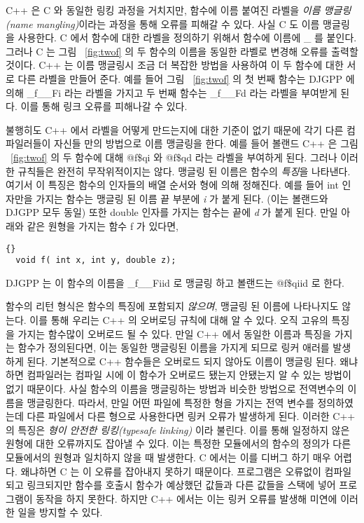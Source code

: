 C++ 은 C 와 동일한 링킹 과정을 거치지만, 함수에 이름 붙여진 라벨을 \emph{이름 맹글링(name mangling)}이라는
과정을 통해 오류를 피해갈 수 있다. 사실 C 도 이름 맹글링을 사용한다. C 에서 함수에 대한 라벨을 정의하기 위해서
함수에 이름에 \_ 를 붙인다. 그러나 C 는 그림 ~\ref{fig:twof} 의 두 함수의 이름을 동일한 라벨로 변경해
오류를 출력할 것이다. C++ 는 이름 맹글링시 조금 더 복잡한 방법을 사용하여 이 두 함수에 대한 서로 다른 라벨을
만들어 준다. 예를 들어 그림 ~\ref{fig:twof} 의 첫 번째 함수는 DJGPP  에 의해 {\code \_f\_\_Fi} 라는 라벨을 가지고
두 번째 함수는 {\code \_f\_\_Fd} 라는 라벨을 부여받게 된다. 이를 통해 링크 오류를 피해나갈 수 있다. 


불행히도 C++ 에서 라벨을 어떻게 만드는지에 대한 기준이 없기 때문에 각기 다른 컴파일러들이 자신들 만의 방법으로
이름 맹글링을 한다. 예를 들어 볼랜드 C++ 은 그림 ~\ref{fig:twof} 의 두 함수에 대해 {\code @f\$qi} 와 {\code @f\$qd}
라는 라벨을 부여하게 된다. 그러나 이러한 규칙들은 완전히 무작위적이지는 않다. 맹글링 된 이름은 함수의
\emph{특징}을 나타낸다. 여기서 이 특징은 함수의 인자들의 배열 순서와 형에 의해 정해진다. 예를 들어 {\code int} 인자만을
가지는 함수는 맹글링 된 이름 끝 부분에 \emph{i} 가 붙게 된다. (이는 볼랜드와 DJGPP 모두 동일) 또한 {\code double} 인자를
가지는 함수는 끝에 \emph{d} 가 붙게 된다. 만일 아래와 같은 원형을 가지는 함수 {\code f} 가 있다면, 

\begin{lstlisting}[stepnumber=0]{}
  void f( int x, int y, double z);
\end{lstlisting}
\noindent DJGPP 는 이 함수의 이름을 {\code \_f\_\_Fiid} 로 맹글링 하고 볼랜드는 {\code @f\$qiid} 로 한다.

함수의 리턴 형식은 함수의 특징에 포함되지 \emph{않으며}, 맹글링 된 이름에 나타나지도 않는다. 
이를 통해 우리는 C++ 의 오버로딩 규칙에 대해 알 수 있다. 오직 고유의 특징을 가지는 함수많이 오버로드 될 수 있다.
만일 C++ 에서 동일한 이름과 특징을 가지는 함수가 정의된다면, 이는 동일한 맹글링된 이름을 가지게 되므로
링커 애러를 발생하게 된다. 기본적으로 C++ 함수들은 오버로드 되지 않아도 이름이 맹글링 된다. 왜냐하면
컴파일러는 컴파일 시에 이 함수가 오버로드 됐는지 안됐는지 알 수 있는 방법이 없기 때문이다.  사실 함수의 이름을
맹글링하는 방법과 비슷한 방법으로 전역변수의 이름을 맹글링한다. 따라서, 만일 어떤 파일에 특정한 형을 가지는
전역 변수를 정의하였는데 다른 파일에서 다른 형으로 사용한다면 링커 오류가 발생하게 된다. 이러한 C++ 의 특징은 
\emph{형이 안전한 링킹(typesafe linking)} 이라 불린다.  이를 통해 일정하지 않은 원형에
대한 오류까지도 잡아낼 수 있다. 이는 특정한 모듈에서의 함수의 정의가 다른 모듈에서의 원형과 일치하지 않을 때 발생한다. 
C 에서는 이를 디버그 하기 매우 어렵다. 왜냐하면 C 는 이 오류를 잡아내지 못하기 때문이다. 프로그램은 오류없이 컴파일되고
링크되지만 함수를 호출시 함수가 예상했던 값들과 다른 값들을 스택에 넣어 프로그램이 동작을 하지 못한다. 하지만 C++ 에서는
이는 링커 오류를 발생해 미연에 이러한 일을 방지할 수 있다. 

